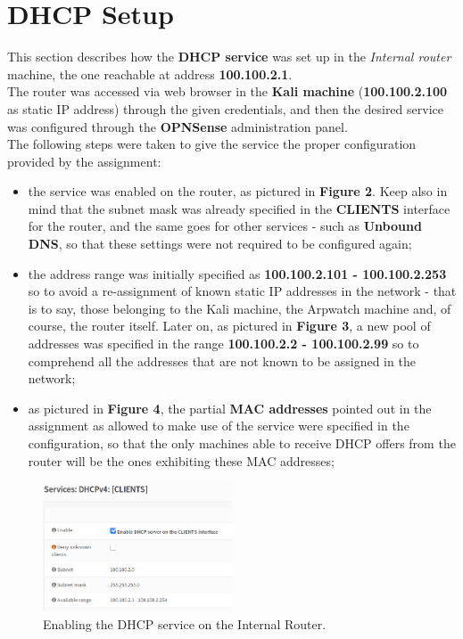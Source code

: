 \section{DHCP Setup}
This section describes how the \textbf{DHCP service} was set up in the \textit{Internal router} machine, the one reachable at address \textbf{100.100.2.1}.\\
The router was accessed via web browser in the \textbf{Kali machine} (\textbf{100.100.2.100} as static IP address) through the given credentials, and then the desired service was configured through the \textbf{OPNSense} administration panel.\\
The following steps were taken to give the service the proper configuration provided by the assignment:\\

\begin{itemize}
\item the service was enabled on the router, as pictured in \textbf{Figure 2}. Keep also in mind that the subnet mask was already specified in the \textbf{CLIENTS} interface for the router, and the same goes for other services - such as \textbf{Unbound DNS}, so that these settings were not required to be configured again;
\item the address range was initially specified as \textbf{100.100.2.101 - 100.100.2.253} so to avoid a re-assignment of known static IP addresses in the network - that is to say, those belonging to the Kali machine, the Arpwatch machine and, of course, the router itself. Later on, as pictured in \textbf{Figure 3}, a new pool of addresses was specified in the range \textbf{100.100.2.2 - 100.100.2.99} so to comprehend all the addresses that are not known to be assigned in the network;
\item as pictured in \textbf{Figure 4}, the partial \textbf{MAC addresses} pointed out in the assignment as allowed to make use of the service were specified in the configuration, so that the only machines able to receive DHCP offers from the router will be the ones exhibiting these MAC addresses;
\end{itemize}

\begin{figure}[htpb]
\centering
\includegraphics[width=0.5\textwidth]{dhcp_clients.png}
\caption[a]{Enabling the DHCP service on the Internal Router.}\label{fig:2}
\end{figure}

